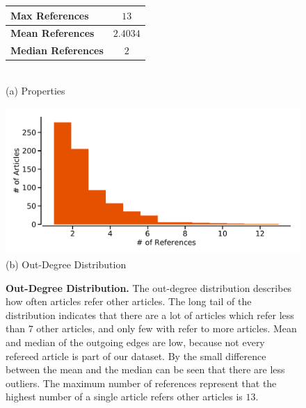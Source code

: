 \begin{figure}[!t]
  \begin{minipage}[!t]{\textwidth}
    \begin{minipage}[b]{0.39\textwidth}
      \centering
      \begin{tabular}{ l c }
        \toprule
        \textbf{Max References}    & $13$     \\ \midrule
        \textbf{Mean References}   & $2.4034$ \\ \midrule
        \textbf{Median References} & $2$      \\
        \bottomrule
    \end{tabular} \\
    \vspace*{1cm}
    (a) Properties
  \end{minipage}
  \begin{minipage}[b]{0.59\textwidth}
    \centering
    \includegraphics[width=1.0\textwidth]{figures/out-degree_distribution} \\
    (b) Out-Degree Distribution
    \end{minipage}
  \end{minipage}
\caption[Out-Degree Distribution of the Citation Network]{\textbf{Out-Degree Distribution.} The out-degree distribution describes how often articles refer other articles. The long tail of the distribution indicates that there are a lot of articles which refer less than $7$ other articles, and only few with refer to more articles. Mean and median of the outgoing edges are low, because not every refereed article is part of our dataset. By the small difference between the mean and the median can be seen that there are less outliers. The maximum number of references represent that the highest number of a single article refers other articles is $13$.}
\label{fig:outdegree_distribution}
\end{figure}

